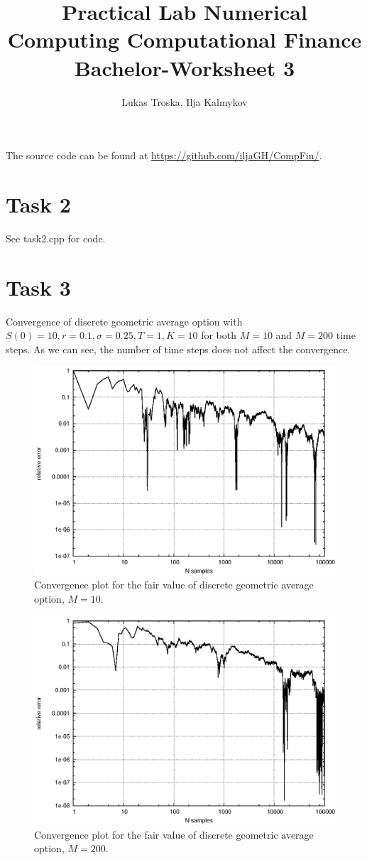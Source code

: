 \documentclass[]{article}
\title{Practical Lab Numerical Computing Computational Finance \\Bachelor-Worksheet 3}
\author{Lukas Troska, Ilja Kalmykov}
\date{}
\begin{document}
\maketitle

The source code can be found at \url{https://github.com/iljaGH/CompFin/}.

\section*{Task 2}
See task2.cpp for code.

\section*{Task 3}
Convergence of discrete geometric average option with $S(0)=10,r=0.1,\sigma=0.25,T=1,K=10$ for both $M=10$ and $M=200$ time steps.
As we can see, the number of time steps does not affect the convergence.
\begin{figure}[!ht]
\centering
\includegraphics[width=.9\textwidth]{task3_10.eps}
\caption{Convergence plot for the fair value of discrete geometric average
option, $M = 10$.}
\label{fig:Task3a}
\end{figure}
\begin{figure}[!ht]
\centering
\includegraphics[width=.9\textwidth]{task3_200.eps}
\caption{Convergence plot for the fair value of discrete geometric average
option, $M = 200$.}
\label{fig:Task3b}
\end{figure}
\clearpage
\end{document}
